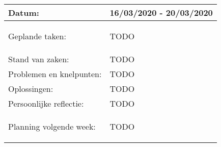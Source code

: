 \begin{tabularx}{\textwidth}{| l | X |}
  \hline
  Datum: & 16/03/2020 - 20/03/2020\\
  \hline
  Geplande taken: &
  \begin{compactitem}
    \item TODO
  \end{compactitem}\\
  \hline
  Stand van zaken: & TODO\\
  \hline
  Problemen en knelpunten: & TODO\\
  \hline
  Oplossingen: & TODO\\
  \hline
  Persoonlijke reflectie: & TODO\\
  \hline
  Planning volgende week: & 
  \begin{compactitem}
    \item TODO
  \end{compactitem}\\
  \hline
\end{tabularx}